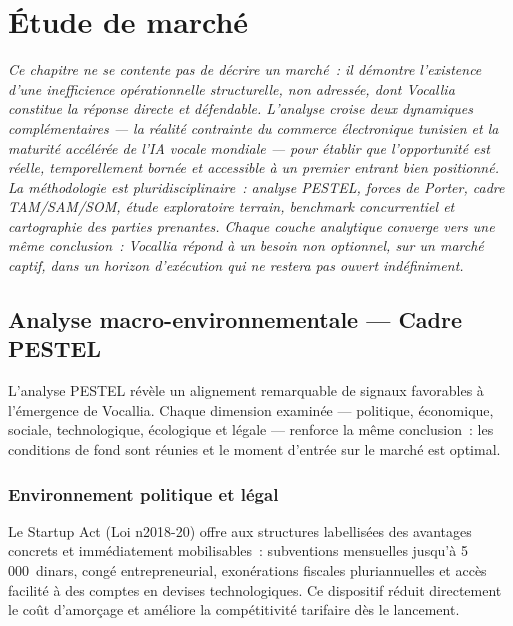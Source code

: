 \chapter{Étude de marché}
\label{Chapitre_2}

\textit{Ce chapitre ne se contente pas de décrire un marché~: il démontre l'existence d'une inefficience opérationnelle structurelle, non adressée, dont Vocallia constitue la réponse directe et défendable. L'analyse croise deux dynamiques complémentaires --- la réalité contrainte du commerce électronique tunisien et la maturité accélérée de l'IA vocale mondiale --- pour établir que l'opportunité est réelle, temporellement bornée et accessible à un premier entrant bien positionné. La méthodologie est pluridisciplinaire~: analyse PESTEL, forces de Porter, cadre TAM/SAM/SOM, étude exploratoire terrain, benchmark concurrentiel et cartographie des parties prenantes. Chaque couche analytique converge vers une même conclusion~: Vocallia répond à un besoin non optionnel, sur un marché captif, dans un horizon d'exécution qui ne restera pas ouvert indéfiniment.}

\section{Analyse macro-environnementale --- Cadre PESTEL}
\label{section2.1}

L'analyse PESTEL révèle un alignement remarquable de signaux favorables à l'émergence de Vocallia. Chaque dimension examinée --- politique, économique, sociale, technologique, écologique et légale --- renforce la même conclusion~: les conditions de fond sont réunies et le moment d'entrée sur le marché est optimal.

\subsection{Environnement politique et légal}
\label{section2.1.1}

Le Startup Act (Loi n\degre{}2018-20) offre aux structures labellisées des avantages concrets et immédiatement mobilisables~: subventions mensuelles jusqu'à 5\,000~dinars, congé entrepreneurial, exonérations fiscales pluriannuelles et accès facilité à des comptes en devises technologiques. Ce dispositif réduit directement le coût d'amorçage et améliore la compétitivité tarifaire dès le lancement.

